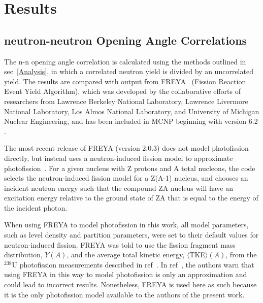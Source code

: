 \chapter{Results}
\thispagestyle{fancy}
\section{neutron-neutron Opening Angle Correlations}
The n-n opening angle correlation is calculated using the methods outlined in sec~\ref{Analysis}, in which a correlated neutron yield is divided by an uncorrelated yield.
The results are compared with output from FREYA~\cite{FREYA} (Fission Reaction Event Yield Algorithm), which was developed by the collaborative efforts of researchers from Lawrence Berkeley National Laboratory,  Lawrence Livermore National Laboratory, Los Almos National Laboratory, and University of Michigan Nuclear Engineering, and has been included in MCNP beginning with version 6.2 .
 
The most recent release of FREYA (version 2.0.3) does not model photofission directly, but instead uses a neutron-induced fission model to approximate photofission~\cite{FREYA_photofission}.
For a given nucleus with Z protons and A total nucleons, the code selects the neutron-induced fission model for a Z(A-1) nucleus, and chooses an incident neutron energy such that the compound ZA nucleus will have an excitation energy relative to the ground state of ZA that is equal to the energy of the incident photon.

When using FREYA to model photofission in this work, all model parameters, such as level density and partition parameters, were set to their default values for neutron-induced fission.
FREYA was told to use the fission fragment mass distribution, $Y(A)$, and the average total kinetic energy, $\langle$TKE$\rangle(A)$, from the $^{238}$U photofission measurements described in ref~\cite{2017Krishichayan}.
In ref~\cite{Talou2018}, the authors warn that using FREYA in this way to model photofission is only an approximation and could lead to incorrect results.
Nonetheless, FREYA is used here as such because it is the only photofission model available to the authors of the present work.

